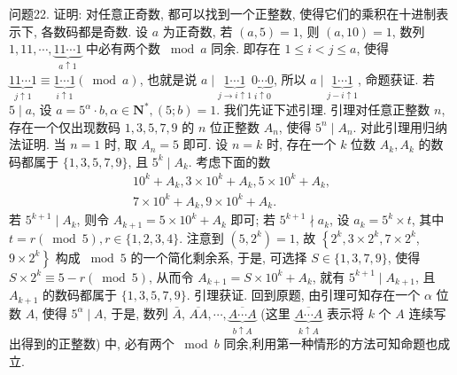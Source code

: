 问题22. 证明: 对任意正奇数, 都可以找到一个正整数, 使得它们的乘积在十进制表示下, 各数码都是奇数.
设 $a$ 为正奇数, 若 $(a, 5)=1$, 则 $(a, 10)=1$, 数列 $1,11, \cdots, \underbrace{11 \cdots 1}_{a \uparrow 1}$ 中必有两个数 $\bmod a$ 同余.
即存在 $1 \leqslant i<j \leqslant a$, 使得 $\underbrace{11 \cdots 1}_{j \uparrow 1} \equiv \underbrace{1 \cdots 1}_{i \uparrow 1}(\bmod a)$, 也就是说 $a \mid \underbrace{1 \cdots 1}_{j \rightarrow i \uparrow 1} \underbrace{0 \cdots 0}_{i \uparrow 0}$, 所以 $a \mid \underbrace{1 \cdots 1}_{j-i \uparrow 1}$, 命题获证.
若 $5 \mid a$, 设 $a=5^\alpha \cdot b, \alpha \in \mathbf{N}^*,(5 ; b)=1$. 我们先证下述引理.
引理对任意正整数 $n$, 存在一个仅出现数码 $1,3,5,7,9$ 的 $n$ 位正整数 $A_n$, 使得 $5^n \mid A_n$.
对此引理用归纳法证明.
当 $n=1$ 时, 取 $A_n=5$ 即可.
设 $n=k$ 时, 存在一个 $k$ 位数 $A_k, A_k$ 的数码都属于 $\{1,3,5,7,9\}$, 且 $5^k \mid A_k$. 考虑下面的数
$$
\begin{gathered}
10^k+A_k, 3 \times 10^k+A_k, 5 \times 10^k+A_k, \\
7 \times 10^k+A_k, 9 \times 10^k+A_k .
\end{gathered}
$$
若 $5^{k+1} \mid A_k$, 则令 $A_{k+1}=5 \times 10^k+A_k$ 即可; 若 $5^{k+1} \nmid a_k$, 设 $a_k=5^k \times t$, 其中 $t=r(\bmod 5), r \in\{1,2,3,4\}$. 注意到 $\left(5,2^k\right)=1$, 故 $\left\{2^k, 3 \times 2^k, 7 \times 2^k\right.$, $\left.9 \times 2^k\right\}$ 构成 $\bmod 5$ 的一个简化剩余系, 于是, 可选择 $S \in\{1,3,7,9\}$, 使得 $S \times 2^k \equiv 5-r(\bmod 5)$, 从而令 $A_{k+1}=S \times 10^k+A_k$, 就有 $5^{k+1} \mid A_{k+1}$, 且 $A_{k+1}$ 的数码都属于 $\{1,3,5,7,9\}$. 引理获证.
回到原题, 由引理可知存在一个 $\alpha$ 位数 $A$, 使得 $5^\alpha \mid A$, 于是, 数列 $\bar{A}$, $\overline{A A}, \cdots, \underbrace{\overline{A \cdots A}}_{b \uparrow A}$ (这里 $\underbrace{\overline{A \cdots A}}_{k \uparrow A}$ 表示将 $k$ 个 $A$ 连续写出得到的正整数) 中, 必有两个 $\bmod b$ 同余,利用第一种情形的方法可知命题也成立.



